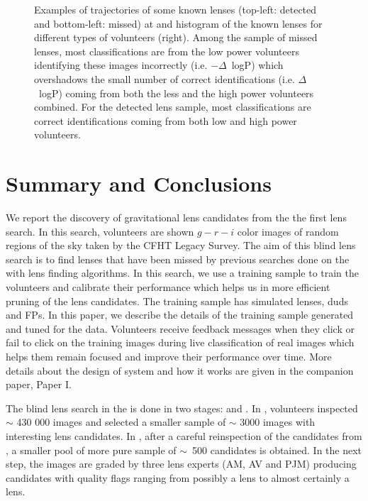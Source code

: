 \documentclass[useAMS,usenatbib,a4paper]{mn2e}
\begin{document}
\begin{figure}
\begin{center}
\caption{ \label{fig:detmis}
Examples of trajectories of some known lenses (top-left: detected and
bottom-left: missed) at \StageOne and histogram of the known lenses for
different types of volunteers (right). Among the sample of missed
lenses, most classifications are from the low power volunteers
identifying these images incorrectly (i.e. $-\Delta$~logP) which
overshadows the small number of correct identifications (i.e.
$\Delta$~logP) coming from both the less and the high power volunteers
combined. For the detected lens sample, most classifications are correct
identifications coming from both low and high power volunteers.
}
\end{center}
\end{figure}



\section{Summary and Conclusions}
\label{sec:conclude}

We report the discovery of gravitational lens candidates from the
the first \sw lens search. In this search, volunteers are shown
$g-r-i$ color images of random regions of the sky taken by the CFHT Legacy
Survey. The aim of this blind lens search is to find lenses that have been
missed by previous searches done on the \cfhtls with lens finding
algorithms. In this search, we use a training sample to train the
volunteers and calibrate their performance which helps us in more
efficient pruning of the lens candidates. The training sample has
simulated lenses, duds and FPs. In this paper, we describe the details
of the training sample generated and tuned for the \cfhtls data.
Volunteers receive feedback messages when they click or fail to click on
the training images during live classification of real images which
helps them remain focused and improve their performance over time. More
details about the design of \sw system and how it works are given in the
companion paper, Paper I.

The blind lens search in the \cfhtls is done in two stages: \StageOne and
\StageTwo. In \StageOne, volunteers inspected $\sim$ 430 000 images and
selected a smaller sample of $\sim$ 3000 images with interesting lens
candidates. In \StageTwo, after a careful reinspection of the candidates
from \StageOne, a smaller pool of more pure sample of $\sim$~500
candidates is obtained. In the next step, the images are graded by three
lens experts (AM, AV and PJM) producing candidates with quality flags
ranging from possibly a lens to almost certainly a lens.
\end{document}
